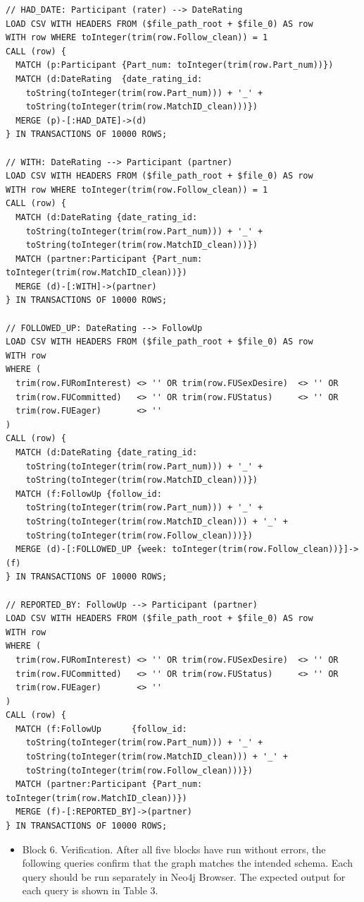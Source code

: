 \documentclass[sn-apa,pdflatex]{sn-jnl}
\theoremstyle{remark}
\theoremstyle{definition}
\providecommand{\tightlist}{%
  \setlength{\itemsep}{0pt}\setlength{\parskip}{0pt}}
\begin{document}
\begin{verbatim}
// HAD_DATE: Participant (rater) --> DateRating
LOAD CSV WITH HEADERS FROM ($file_path_root + $file_0) AS row
WITH row WHERE toInteger(trim(row.Follow_clean)) = 1
CALL (row) {
  MATCH (p:Participant {Part_num: toInteger(trim(row.Part_num))})
  MATCH (d:DateRating  {date_rating_id:
    toString(toInteger(trim(row.Part_num))) + '_' +
    toString(toInteger(trim(row.MatchID_clean)))})
  MERGE (p)-[:HAD_DATE]->(d)
} IN TRANSACTIONS OF 10000 ROWS;

// WITH: DateRating --> Participant (partner)
LOAD CSV WITH HEADERS FROM ($file_path_root + $file_0) AS row
WITH row WHERE toInteger(trim(row.Follow_clean)) = 1
CALL (row) {
  MATCH (d:DateRating {date_rating_id:
    toString(toInteger(trim(row.Part_num))) + '_' +
    toString(toInteger(trim(row.MatchID_clean)))})
  MATCH (partner:Participant {Part_num: toInteger(trim(row.MatchID_clean))})
  MERGE (d)-[:WITH]->(partner)
} IN TRANSACTIONS OF 10000 ROWS;

// FOLLOWED_UP: DateRating --> FollowUp
LOAD CSV WITH HEADERS FROM ($file_path_root + $file_0) AS row
WITH row
WHERE (
  trim(row.FURomInterest) <> '' OR trim(row.FUSexDesire)  <> '' OR
  trim(row.FUCommitted)   <> '' OR trim(row.FUStatus)     <> '' OR
  trim(row.FUEager)       <> ''
)
CALL (row) {
  MATCH (d:DateRating {date_rating_id:
    toString(toInteger(trim(row.Part_num))) + '_' +
    toString(toInteger(trim(row.MatchID_clean)))})
  MATCH (f:FollowUp {follow_id:
    toString(toInteger(trim(row.Part_num))) + '_' +
    toString(toInteger(trim(row.MatchID_clean))) + '_' +
    toString(toInteger(trim(row.Follow_clean)))})
  MERGE (d)-[:FOLLOWED_UP {week: toInteger(trim(row.Follow_clean))}]->(f)
} IN TRANSACTIONS OF 10000 ROWS;

// REPORTED_BY: FollowUp --> Participant (partner)
LOAD CSV WITH HEADERS FROM ($file_path_root + $file_0) AS row
WITH row
WHERE (
  trim(row.FURomInterest) <> '' OR trim(row.FUSexDesire)  <> '' OR
  trim(row.FUCommitted)   <> '' OR trim(row.FUStatus)     <> '' OR
  trim(row.FUEager)       <> ''
)
CALL (row) {
  MATCH (f:FollowUp      {follow_id:
    toString(toInteger(trim(row.Part_num))) + '_' +
    toString(toInteger(trim(row.MatchID_clean))) + '_' +
    toString(toInteger(trim(row.Follow_clean)))})
  MATCH (partner:Participant {Part_num: toInteger(trim(row.MatchID_clean))})
  MERGE (f)-[:REPORTED_BY]->(partner)
} IN TRANSACTIONS OF 10000 ROWS;
\end{verbatim}

\begin{itemize}
\tightlist
\item
  Block 6. Verification. After all five blocks have run without errors,
  the following queries confirm that the graph matches the intended
  schema. Each query should be run separately in Neo4j Browser. The
  expected output for each query is shown in Table 3.
\end{itemize}
\end{document}
